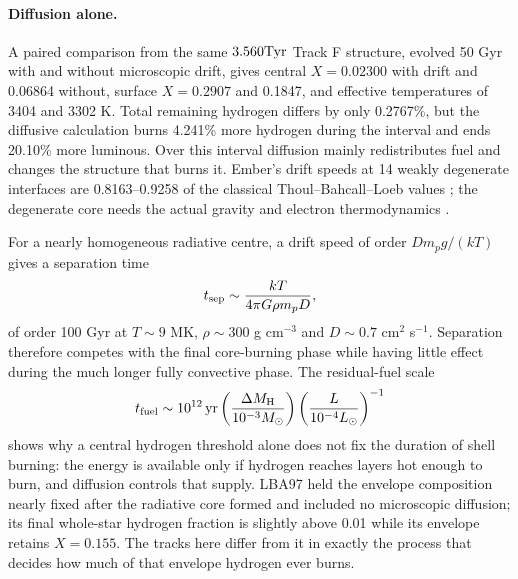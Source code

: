 \paragraph{Diffusion alone.}
A paired comparison from the same $3.560\mathrm{Tyr}$ Track F structure, evolved
50 Gyr with and without microscopic drift, gives central $X=0.02300$ with
drift and 0.06864 without, surface $X=0.2907$ and 0.1847, and effective
temperatures of 3404 and 3302 K. Total remaining hydrogen differs by only
0.2767\%, but the diffusive calculation burns 4.241\% more hydrogen during
the interval and ends 20.10\% more luminous. Over this interval diffusion
mainly redistributes fuel and changes the structure that burns it. Ember's
drift speeds at 14 weakly degenerate interfaces are 0.8163--0.9258 of the
classical Thoul--Bahcall--Loeb values \cite{thoul94}; the degenerate core
needs the actual gravity and electron thermodynamics \cite{paxton18}.

For a nearly homogeneous radiative centre, a drift speed of order
$Dm_pg/(kT)$ gives a separation time
\begin{equation}
 t_{\rm sep}\sim\frac{kT}{4\pi G\rho m_pD},
\end{equation}
of order 100 Gyr at $T\sim9$ MK, $\rho\sim300$ g cm$^{-3}$ and
$D\sim0.7$ cm$^2$ s$^{-1}$. Separation therefore competes with the final
core-burning phase while having little effect during the much longer fully
convective phase. The residual-fuel scale
\begin{equation}
 t_{\rm fuel}\sim10^{12}\,{\rm yr}\left(\frac{\Delta M_{\rm H}}{10^{-3}M_\odot}\right)
 \left(\frac{L}{10^{-4}L_\odot}\right)^{-1}
\end{equation}
shows why a central hydrogen threshold alone does not fix the duration of
shell burning: the energy is available only if hydrogen reaches layers hot
enough to burn, and diffusion controls that supply. LBA97 held the envelope
composition nearly fixed after the radiative core formed and included no
microscopic diffusion; its final whole-star hydrogen fraction is slightly
above 0.01 while its envelope retains $X=0.155$. The tracks here differ from
it in exactly the process that decides how much of that envelope hydrogen
ever burns.

